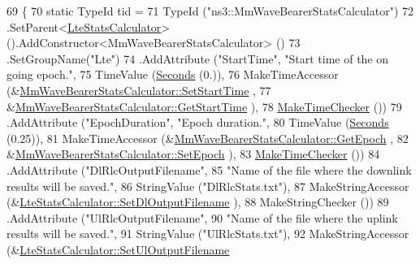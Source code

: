 \begin{DoxyCode}
69 \{
70   \textcolor{keyword}{static} TypeId tid =
71     TypeId (\textcolor{stringliteral}{"ns3::MmWaveBearerStatsCalculator"})
72     .SetParent<\hyperlink{classns3_1_1LteStatsCalculator_a4d74204c35bb226063fb38662072b272}{LteStatsCalculator}> ().AddConstructor<MmWaveBearerStatsCalculator> ()
73     .SetGroupName(\textcolor{stringliteral}{"Lte"})
74     .AddAttribute (\textcolor{stringliteral}{"StartTime"}, \textcolor{stringliteral}{"Start time of the on going epoch."}, 
75                    TimeValue (\hyperlink{group__timecivil_ga33c34b816f8ff6628e33d5c8e9713b9e}{Seconds} (0.)),
76                    MakeTimeAccessor (&\hyperlink{classns3_1_1MmWaveBearerStatsCalculator_adaec4fdc21febe1d4ebfe31580791c89}{MmWaveBearerStatsCalculator::SetStartTime}
      ,
77                                      &\hyperlink{classns3_1_1MmWaveBearerStatsCalculator_aa37e32dc3164d81cb7b43349c0a7d53b}{MmWaveBearerStatsCalculator::GetStartTime}
      ),
78                    \hyperlink{group__time_ga7032965bd4afa578691d88c09e4481c1}{MakeTimeChecker} ())
79     .AddAttribute (\textcolor{stringliteral}{"EpochDuration"}, \textcolor{stringliteral}{"Epoch duration."}, 
80                    TimeValue (\hyperlink{group__timecivil_ga33c34b816f8ff6628e33d5c8e9713b9e}{Seconds} (0.25)), 
81                    MakeTimeAccessor (&\hyperlink{classns3_1_1MmWaveBearerStatsCalculator_a0d17d626f01a537e834abe961bd48b32}{MmWaveBearerStatsCalculator::GetEpoch}
      ,
82                                      &\hyperlink{classns3_1_1MmWaveBearerStatsCalculator_a47ab01fb08181090c33ee6f628ab3858}{MmWaveBearerStatsCalculator::SetEpoch}
      ),
83                    \hyperlink{group__time_ga7032965bd4afa578691d88c09e4481c1}{MakeTimeChecker} ())
84     .AddAttribute (\textcolor{stringliteral}{"DlRlcOutputFilename"},
85                    \textcolor{stringliteral}{"Name of the file where the downlink results will be saved."},
86                    StringValue (\textcolor{stringliteral}{"DlRlcStats.txt"}),
87                    MakeStringAccessor (&\hyperlink{classns3_1_1LteStatsCalculator_a1cd704e00a2384ef49fa74a7d29f91c1}{LteStatsCalculator::SetDlOutputFilename}
      ),
88                    MakeStringChecker ())
89     .AddAttribute (\textcolor{stringliteral}{"UlRlcOutputFilename"},
90                    \textcolor{stringliteral}{"Name of the file where the uplink results will be saved."},
91                    StringValue (\textcolor{stringliteral}{"UlRlcStats.txt"}),
92                    MakeStringAccessor (&\hyperlink{classns3_1_1LteStatsCalculator_a47ced91f91ab7550e347ee1a933ca998}{LteStatsCalculator::SetUlOutputFilename}

\end{DoxyCode}
